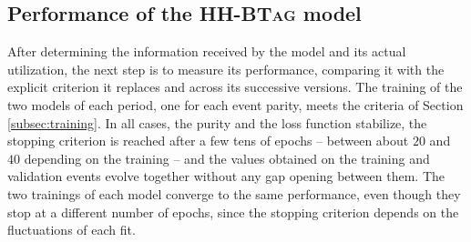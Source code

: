 


\subsection{Performance of the \textsc{HH-BTag} model}
\label{subsec:hhbtag_performance}
%
After determining the information received by the model and its actual utilization, the next step is to measure its performance, comparing it with the explicit criterion it replaces and across its successive versions. The training of the two models of each period, one for each event parity, meets the criteria of Section \ref{subsec:training}. In all cases, the purity and the loss function stabilize, the stopping criterion is reached after a few tens of epochs -- between about $20$ and $40$ depending on the training -- and the values obtained on the training and validation events evolve together without any gap opening between them. The two trainings of each model converge to the same performance, even though they stop at a different number of epochs, since the stopping criterion depends on the fluctuations of each fit.\medskip



